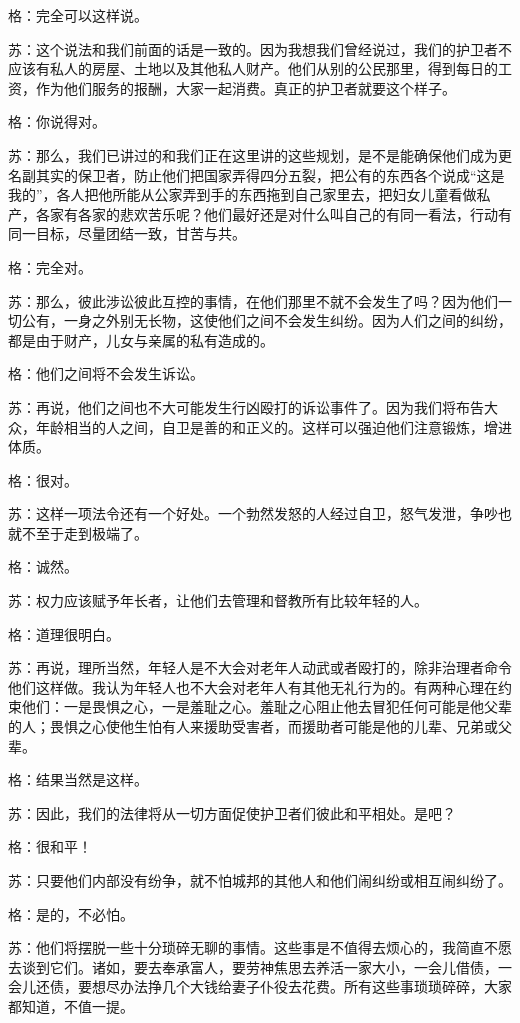 \documentclass[12pt,oneside]{book}
\begin{document}
格：完全可以这样说。

苏：这个说法和我们前面的话是一致的。因为我想我们曾经说过，我们的护卫者不应该有私人的房屋、土地以及其他私人财产。他们从别的公民那里，得到每日的工资，作为他们服务的报酬，大家一起消费。真正的护卫者就要这个样子。

格：你说得对。

苏：那么，我们已讲过的和我们正在这里讲的这些规划，是不是能确保他们成为更名副其实的保卫者，防止他们把国家弄得四分五裂，把公有的东西各个说成“这是我的”，各人把他所能从公家弄到手的东西拖到自己家里去，把妇女儿童看做私产，各家有各家的悲欢苦乐呢？他们最好还是对什么叫自己的有同一看法，行动有同一目标，尽量团结一致，甘苦与共。

格：完全对。

苏：那么，彼此涉讼彼此互控的事情，在他们那里不就不会发生了吗？因为他们一切公有，一身之外别无长物，这使他们之间不会发生纠纷。因为人们之间的纠纷，都是由于财产，儿女与亲属的私有造成的。

格：他们之间将不会发生诉讼。

苏：再说，他们之间也不大可能发生行凶殴打的诉讼事件了。因为我们将布告大众，年龄相当的人之间，自卫是善的和正义的。这样可以强迫他们注意锻炼，增进体质。

格：很对。

苏：这样一项法令还有一个好处。一个勃然发怒的人经过自卫，怒气发泄，争吵也就不至于走到极端了。

格：诚然。

苏：权力应该赋予年长者，让他们去管理和督教所有比较年轻的人。

格：道理很明白。

苏：再说，理所当然，年轻人是不大会对老年人动武或者殴打的，除非治理者命令他们这样做。我认为年轻人也不大会对老年人有其他无礼行为的。有两种心理在约束他们：一是畏惧之心，一是羞耻之心。羞耻之心阻止他去冒犯任何可能是他父辈的人；畏惧之心使他生怕有人来援助受害者，而援助者可能是他的儿辈、兄弟或父辈。

格：结果当然是这样。

苏：因此，我们的法律将从一切方面促使护卫者们彼此和平相处。是吧？

格：很和平！

苏：只要他们内部没有纷争，就不怕城邦的其他人和他们闹纠纷或相互闹纠纷了。

格：是的，不必怕。

苏：他们将摆脱一些十分琐碎无聊的事情。这些事是不值得去烦心的，我简直不愿去谈到它们。诸如，要去奉承富人，要劳神焦思去养活一家大小，一会儿借债，一会儿还债，要想尽办法挣几个大钱给妻子仆役去花费。所有这些事琐琐碎碎，大家都知道，不值一提。
\end{document}
